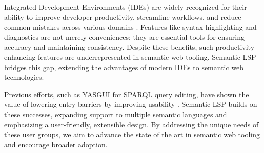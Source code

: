 Integrated Development Environments (IDEs) are widely recognized for their ability to improve developer productivity, streamline workflows, and reduce common mistakes across various domains \cite{javaEngineer}. 
Features like syntax highlighting and diagnostics are not merely conveniences; they are essential tools for ensuring accuracy and maintaining consistency. 
Despite these benefits, such productivity-enhancing features are underrepresented in semantic web tooling.
Semantic LSP bridges this gap, extending the advantages of modern IDEs to semantic web technologies.

Previous efforts, such as YASGUI for SPARQL query editing, have shown the value of lowering entry barriers by improving usability \cite{10.3233/SW-150197,10.1007/978-3-642-41242-4_7}. 
Semantic LSP builds on these successes, expanding support to multiple semantic languages and emphasizing a user-friendly, extensible design. 
By addressing the unique needs of these user groups, we aim to advance the state of the art in semantic web tooling and encourage broader adoption.


